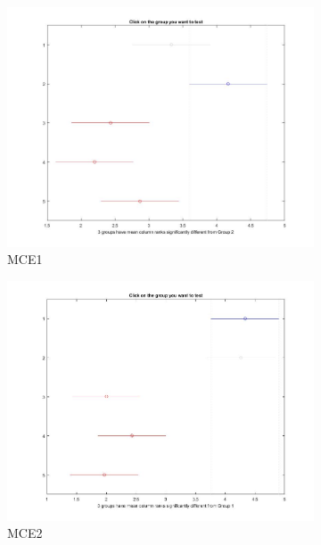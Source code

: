 \begin{figure}
	\centering
	\begin{subfigure}[b]{0.49\linewidth}
		\includegraphics[width=\linewidth]{Figures/NMELA_FB_P1}
		\caption{MCE1} \label{fig:M1} 
	\end{subfigure}
	\begin{subfigure}[b]{0.49\linewidth}
		\includegraphics[width=\textwidth]{Figures/NMELA_FB_P2}
		\caption{MCE2} \label{fig:M2} 
	\end{subfigure}
	\begin{subfigure}[b]{0.49\linewidth}

\end{subfigure}
\end{figure}
